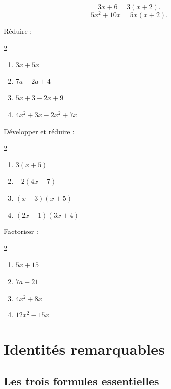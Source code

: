 \documentclass[11pt,a4paper]{article}
\newcounter{exercice}
\begin{document}
\begin{exemple}
\[
3x+6=3(x+2).
\]
\[
5x^2+10x=5x(x+2).
\]
\end{exemple}

\begin{exercice}
Réduire :
\begin{multicols}{2}
\begin{enumerate}[label=\alph*)]
  \item $3x+5x$
  \item $7a-2a+4$
  \item $5x+3-2x+9$
  \item $4x^2+3x-2x^2+7x$
\end{enumerate}
\end{multicols}
\end{exercice}

\begin{exercice}[Méthode]
Développer et réduire :
\begin{multicols}{2}
\begin{enumerate}[label=\alph*)]
  \item $3(x+5)$
  \item $-2(4x-7)$
  \item $(x+3)(x+5)$
  \item $(2x-1)(3x+4)$
\end{enumerate}
\end{multicols}
\end{exercice}

\begin{exercice}[Méthode]
Factoriser :
\begin{multicols}{2}
\begin{enumerate}[label=\alph*)]
  \item $5x+15$
  \item $7a-21$
  \item $4x^2+8x$
  \item $12x^2-15x$
\end{enumerate}
\end{multicols}
\end{exercice}

\newpage

\section{Identités remarquables}

\subsection{Les trois formules essentielles}
\end{document}
